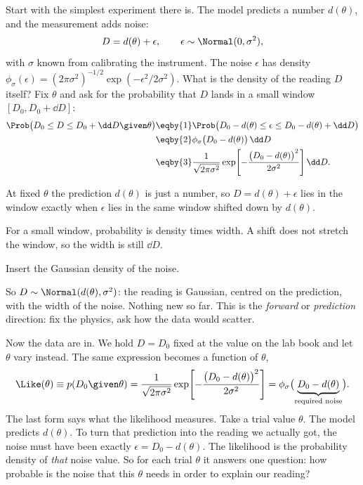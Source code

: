 Start with the simplest experiment there is. The model predicts a number
$d(\theta)$, and the measurement adds noise:
\begin{equation}
  D = d(\theta) + \epsilon,\qquad \epsilon\sim\Normal(0,\sigma^2),
  \label{3b:eq:model-noise}
\end{equation}
with $\sigma$ known from calibrating the instrument. The noise $\epsilon$
 has density
$\phi_\sigma(\epsilon)=(2\pi\sigma^2)^{-1/2}\exp(-\epsilon^2/2\sigma^2)$.
What is the density of the reading $D$ itself? Fix $\theta$ and ask for the
probability that $D$ lands in a small window $[D_0,D_0+\dd D]$:
\begin{align}
  \Prob\bigl(D_0\le D\le D_0+\dd D\given\theta\bigr)
  &\eqby{1} \Prob\bigl(D_0-d(\theta)\le \epsilon\le D_0-d(\theta)+\dd D\bigr)
  \nonumber\\
  &\eqby{2} \phi_\sigma\bigl(D_0-d(\theta)\bigr)\,\dd D
  \nonumber\\
  &\eqby{3} \frac{1}{\sqrt{2\pi\sigma^2}}
     \exp\!\left[-\frac{\bigl(D_0-d(\theta)\bigr)^2}{2\sigma^2}\right]\dd D .
  \label{3b:eq:one-point}
\end{align}
\begin{explain}
  \item At fixed $\theta$ the prediction $d(\theta)$ is just a number, so
        $D=d(\theta)+\epsilon$ lies in the window exactly when $\epsilon$
        lies in the same window shifted down by $d(\theta)$.
  \item For a small window, probability is density times width. A shift does
        not stretch the window, so the width is still $\dd D$.
  \item Insert the Gaussian density of the noise.
\end{explain}
So $D\sim\Normal(d(\theta),\sigma^2)$: the reading is Gaussian, centred on
the prediction, with the width of the noise. Nothing new so far. This is the
\emph{forward} or \emph{prediction} direction: fix the physics, ask how the
data would scatter.

Now the data are in. We hold $D=D_0$ fixed at the value on the lab book and
let $\theta$ vary instead. The same expression becomes a function of $\theta$,
\begin{equation}
  \Like(\theta)\equiv p(D_0\given\theta)
  =\frac{1}{\sqrt{2\pi\sigma^2}}
   \exp\!\left[-\frac{\bigl(D_0-d(\theta)\bigr)^2}{2\sigma^2}\right]
  =\phi_\sigma\bigl(\underbrace{D_0-d(\theta)}_{\text{required noise}}\bigr).
  \label{3b:eq:like-one}
\end{equation}
The last form says what the likelihood measures. Take a trial value
$\theta$. The model predicts $d(\theta)$. To turn that prediction into the
reading we actually got, the noise must have been exactly
$\epsilon=D_0-d(\theta)$. The likelihood is the probability density of
\emph{that} noise value. So for each trial $\theta$ it answers one question:
how probable is the noise that this $\theta$ needs in order to explain our
reading?

